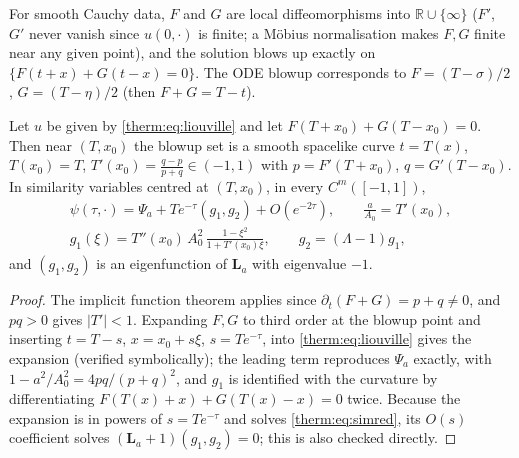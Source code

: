 For smooth Cauchy data, $F$ and $G$ are local diffeomorphisms into
$\mathbb{R}\cup\{\infty\}$ ($F'$, $G'$ never vanish since $u(0,\cdot)$ is finite; a M\"obius
normalisation makes $F,G$ finite near any given point), and the solution blows up
exactly on $\{F(t+x)+G(t-x)=0\}$.  The ODE blowup corresponds
to $F=(T-\sigma)/2$, $G=(T-\eta)/2$ (then $F+G=T-t$).

\begin{proposition}\label{therm:prop:liouville}
Let $u$ be given by \cref{therm:eq:liouville} and let $F(T+x_0)+G(T-x_0)=0$.  Then near
$(T,x_0)$ the blowup set is a smooth spacelike curve $t=T(x)$, $T(x_0)=T$,
$T'(x_0)=\frac{q-p}{p+q}\in(-1,1)$ with $p=F'(T+x_0)$, $q=G'(T-x_0)$.  In similarity
variables centred at $(T,x_0)$, in every $C^m([-1,1])$,
\begin{equation}\label{therm:eq:liouexp}
\begin{gathered}
  \psi(\tau,\cdot)=\Psi_a+Te^{-\tau}(g_1,g_2)+O(e^{-2\tau}),\qquad
  \frac{a}{A_0}=T'(x_0),\\
  g_1(\xi)=T''(x_0)\,A_0^2\,\frac{1-\xi^2}{1+T'(x_0)\xi},\qquad g_2=(\Lambda-1)g_1,
\end{gathered}
\end{equation}
and $(g_1,g_2)$ is an eigenfunction of $\mathbf L_a$ with eigenvalue $-1$.
\end{proposition}

\begin{proof}
The implicit function theorem applies since $\partial_t(F+G)=p+q\ne0$, and $pq>0$ gives
$|T'|<1$.  Expanding $F,G$ to third order at the blowup point and inserting
$t=T-s$, $x=x_0+s\xi$, $s=Te^{-\tau}$, into \cref{therm:eq:liouville} gives the expansion
(verified symbolically); the leading term reproduces $\Psi_a$ exactly, with
$1-a^2/A_0^2=4pq/(p+q)^2$, and $g_1$ is identified with the curvature by
differentiating $F(T(x)+x)+G(T(x)-x)=0$ twice.  Because the expansion is in powers of
$s=Te^{-\tau}$ and solves \cref{therm:eq:simred}, its $O(s)$ coefficient solves
$(\mathbf L_a+1)(g_1,g_2)=0$; this is also checked directly.
\end{proof}

